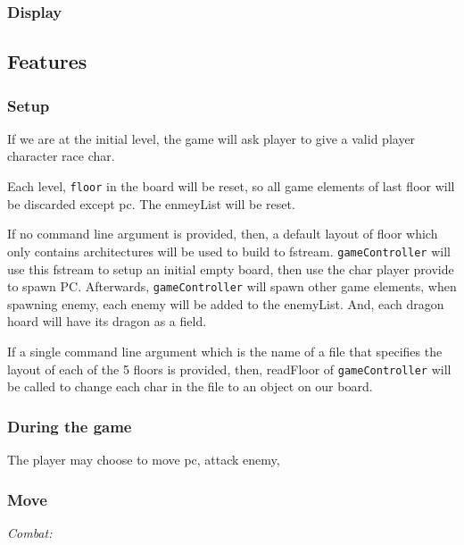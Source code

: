 \documentclass[11pt]{article}
\theoremstyle{plain} \newtheorem{theorem*}{Theorem}[subsection]
\begin{document}
\subsubsection{Display}





\subsection{Features}

\subsubsection{Setup}

If we are at the initial level, 
the game will ask player to give a valid player character race char.

Each level, \texttt{floor} in the board will be reset, so all game elements of 
last floor will be discarded except pc. The \textsf{enmeyList} will be reset.

If no command line argument is provided, then, a default layout of floor which
only contains architectures will be used to build to fstream. 
\texttt{gameController} will use this fstream to setup an initial empty
board, then use the char player provide to spawn PC. Afterwards, 
\texttt{gameController} will spawn other game elements, when spawning 
enemy, each enemy will be added to the \textsf{enemyList}. And, each
dragon hoard will have its dragon as a field.

If a single command line argument which is the name of a file that specifies
the layout of each of the 5 floors is provided, then, \textsf{readFloor}
of \texttt{gameController} will be called to change each char in the file to
an object on our board. 


\subsubsection{ During the game }

The player may choose to move pc, attack enemy, 


\subsubsection{Move}

\textit{Combat: }
\end{document}
